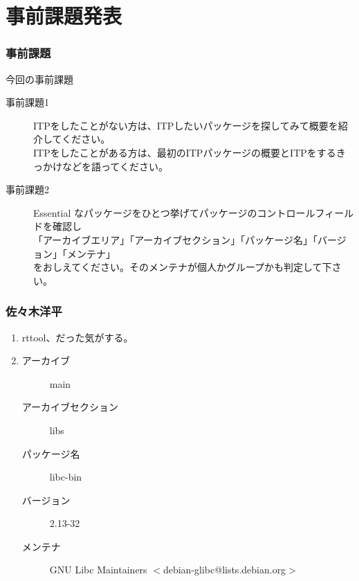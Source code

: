 \documentclass[cjk,dvipdfmx,10pt,%
hyperref={bookmarks=true,bookmarksnumbered=true,bookmarksopen=false,%
colorlinks=false,%
pdftitle={第 59 回 関西 Debian 勉強会},%
pdfauthor={倉敷・のがた・かわだ・佐々木},%
pdfsubject={資料},%
}]{beamer}
\begin{document}
\section{事前課題発表}


\begin{frame}[fragile]
\frametitle{事前課題}

\begin{block}{今回の事前課題}
  \begin{description}
  \item[事前課題1] ITPをしたことがない方は、ITPしたいパッケージを探してみて概要を紹介してください。\\
     ITPをしたことがある方は、最初のITPパッケージの概要とITPをするきっかけなどを語ってください。
  \item[事前課題2] Essential なパッケージをひとつ挙げてパッケージのコントロールフィールドを確認し\\
    「アーカイブエリア」「アーカイブセクション」「パッケージ名」「バージョン」「メンテナ」\\
    をおしえてください。そのメンテナが個人かグループかも判定して下さい。
  \end{description}
\end{block}

\end{frame}


\begin{frame}
  \frametitle{ 佐々木洋平 }
  \begin{enumerate}
  \item rttool、だった気がする。
  \item 
    \begin{description}
    \item [アーカイブ] main
    \item [アーカイブセクション] libs
    \item [パッケージ名] libc-bin
    \item [バージョン] 2.13-32
    \item [メンテナ] GNU Libc Maintainers $<$debian-glibc@lists.debian.org$>$
    \end{description}
  \end{enumerate}
\end{frame}
\end{document}
